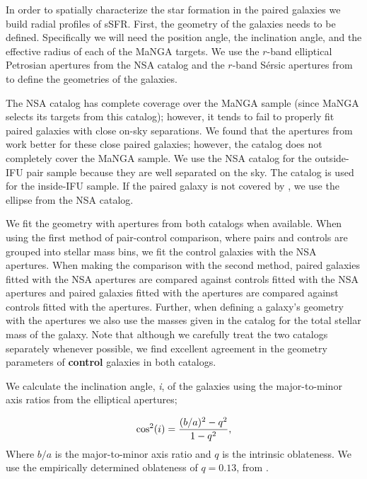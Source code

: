 \documentclass[iop,revtex4,twocolumn,apj,numberedappendix,appendixfloats]{emulateapj}
\begin{document}
In order to spatially characterize the star formation in the paired galaxies we build radial profiles of sSFR. First, the geometry of the galaxies needs to be defined. Specifically we will need the position angle, the inclination angle, and the effective radius of each of the MaNGA targets. We use the $r$-band elliptical Petrosian apertures from the NSA catalog and the $r$-band S\'ersic apertures from \citet{Simard:2011} to define the geometries of the galaxies. 

The NSA catalog has complete coverage over the MaNGA sample (since MaNGA selects its targets from this catalog); however, it tends to fail to properly fit paired galaxies with close on-sky separations. We found that the apertures from \citet{Simard:2011} work better for these close paired galaxies; however, the catalog does not completely cover the MaNGA sample. We use the NSA catalog for the outside-IFU pair sample because they are well separated on the sky. The \citet{Simard:2011} catalog is used for the inside-IFU sample. If the paired galaxy is not covered by \citet{Simard:2011}, we use the ellipse from the NSA catalog. 

We fit the geometry with apertures from both catalogs when available. When using the first method of pair-control comparison, where pairs and controls are grouped into stellar mass bins, we fit the control galaxies with the NSA apertures. When making the comparison with the second method, paired galaxies fitted with the NSA apertures are compared against controls fitted with the NSA apertures and paired galaxies fitted with the \citet{Simard:2011} apertures are compared against controls fitted with the \citet{Simard:2011} apertures. Further, when defining a galaxy's geometry with the \citet{Simard:2011} apertures we also use the masses given in the catalog for the total stellar mass of the galaxy. Note that although we carefully treat the two catalogs separately whenever possible, we find excellent agreement in the geometry parameters of \textbf{control} galaxies in both catalogs.

We calculate the inclination angle, {\it i}, of the galaxies using the major-to-minor axis ratios from the elliptical apertures;

\begin{equation}
{\rm cos^2}(i) = \frac{(b/a)^2 - q^2}{1 - q^2},
\end{equation}
Where $b/a$ is the major-to-minor axis ratio and $q$ is the intrinsic oblateness. We use the empirically determined oblateness of $q = 0.13$, from \citet{Giovanelli:1994}.
\end{document}
